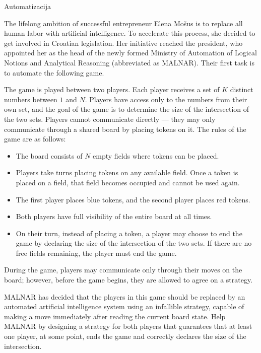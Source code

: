 \begin{statement}[
  problempoints=100,
  timelimit=6 seconds,
  memorylimit=512 MiB,
]{Automatizacija}

The lifelong ambition of successful entrepreneur Elena Mošus is to replace all human labor 
with artificial intelligence.  
To accelerate this process, she decided to get involved in Croatian legislation.  
Her initiative reached the president, who appointed her as the head of the newly formed 
Ministry of Automation of Logical Notions and Analytical Reasoning 
(abbreviated as MALNAR).  
Their first task is to automate the following game.

The game is played between two players.  
Each player receives a set of $K$ distinct numbers between $1$ and $N$.  
Players have access only to the numbers from their own set, and the goal of the game 
is to determine the size of the intersection of the two sets.  
Players cannot communicate directly — they may only communicate through a shared board 
by placing tokens on it.  
The rules of the game are as follows:
\begin{itemize}[noitemsep,topsep=0pt,parsep=0pt,partopsep=0pt]
  \item 
  The board consists of $N$ empty fields where tokens can be placed. 

  \item 
  Players take turns placing tokens on any available field.  
  Once a token is placed on a field, that field becomes occupied and cannot be used again. 

  \item 
  The first player places blue tokens, and the second player places red tokens.

  \item 
  Both players have full visibility of the entire board at all times.

  \item 
  On their turn, instead of placing a token, a player may choose to end the game 
  by declaring the size of the intersection of the two sets.  
  If there are no free fields remaining, the player must end the game.
\end{itemize}
During the game, players may communicate only through their moves on the board; however, 
before the game begins, they are allowed to agree on a strategy.

MALNAR has decided that the players in this game should be replaced 
by an automated artificial intelligence system using an infallible strategy, capable of 
making a move immediately after reading the current board state.  
Help MALNAR by designing a strategy for both players 
that guarantees that at least one player, at some point, ends the game and correctly 
declares the size of the intersection.


\end{statement}
